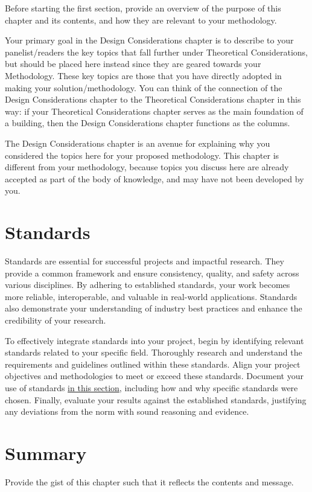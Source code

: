 Before starting the first section, provide an overview of the purpose of this chapter and its contents, and how they are relevant to your methodology. 

Your primary goal in the Design Considerations chapter is to describe to your panelist/readers the key topics that fall further under Theoretical Considerations, but should be placed here instead since they are geared towards your Methodology. These key topics are those that you have directly adopted in making your solution/methodology.  You can think of the connection of the Design Considerations chapter to the Theoretical Considerations chapter in this way: if your Theoretical Considerations chapter serves as the main foundation of a building, then the Design Considerations chapter functions as the columns. 

The  Design Considerations chapter is an avenue for explaining why you considered the topics here for your proposed methodology. This chapter is different from your methodology, because topics you discuss here are already accepted as part of the body of knowledge, and may have not been developed by you.  

\section{Standards}

Standards are essential for successful projects and impactful research. They provide a common framework and ensure consistency, quality, and safety across various disciplines. By adhering to established standards, your work becomes more reliable, interoperable, and valuable in real-world applications. Standards also demonstrate your understanding of industry best practices and enhance the credibility of your research.

To effectively integrate standards into your project, begin by identifying relevant standards related to your specific field. Thoroughly research and understand the requirements and guidelines outlined within these standards. Align your project objectives and methodologies to meet or exceed these standards. Document your use of standards \underline{in this section}, including how and why specific standards were chosen. Finally, evaluate your results against the established standards, justifying any deviations from the norm with sound reasoning and evidence.

\section{Summary}

Provide the gist of this chapter such that it reflects the contents and message.